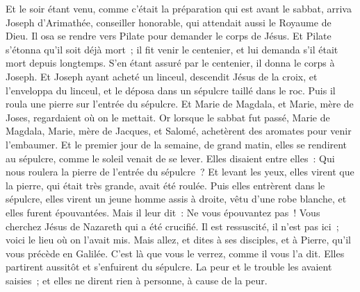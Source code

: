 \begin{multicols}{2}
Et le soir étant venu, comme c'était la préparation qui est avant le sabbat,
arriva Joseph d'Arimathée, conseiller honorable, qui attendait aussi le Royaume de Dieu. Il osa se rendre vers Pilate pour demander le corps de Jésus.
Et Pilate s'étonna qu'il soit déjà mort~; il fit venir le centenier, et lui demanda s'il était mort depuis longtemps.
S'en étant assuré par le centenier, il donna le corps à Joseph.
Et Joseph ayant acheté un linceul, descendit Jésus de la croix, et l'enveloppa du linceul, et le déposa dans un sépulcre taillé dans le roc. Puis il roula une pierre sur l'entrée du sépulcre.
Et Marie de Magdala, et Marie, mère de Joses, regardaient où on le mettait.
\VerseOne{}Or lorsque le sabbat fut passé, Marie de Magdala, Marie, mère de Jacques, et Salomé, achetèrent des aromates pour venir l'embaumer.
Et le premier jour de la semaine, de grand matin, elles se rendirent au sépulcre, comme le soleil venait de se lever.
Elles disaient entre elles~: Qui nous roulera la pierre de l'entrée du sépulcre~?
Et levant les yeux, elles virent que la pierre, qui était très grande, avait été roulée.
Puis elles entrèrent dans le sépulcre, elles virent un jeune homme assis à droite, vêtu d'une robe blanche, et elles furent épouvantées.
Mais il leur dit~: Ne vous épouvantez pas~! Vous cherchez Jésus de Nazareth qui a été crucifié. Il est ressuscité, il n'est pas ici~; voici le lieu où on l'avait mis.
Mais allez, et dites à ses disciples, et à Pierre, qu'il vous précède en Galilée. C'est là que vous le verrez, comme il vous l'a dit.
Elles partirent aussitôt et s'enfuirent du sépulcre. La peur et le trouble les avaient saisies~; et elles ne dirent rien à personne, à cause de la peur.

\end{multicols}
